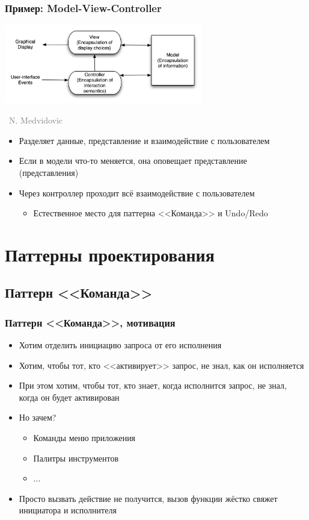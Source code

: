 \documentclass[xetex,mathserif,serif]{beamer}
\newcommand{\attribution}[1] {
    \vspace{-5mm}\begin{flushright}\begin{scriptsize}\textcolor{gray}{\textcopyright\, #1}\end{scriptsize}\end{flushright}
}
\begin{document}
    \begin{frame}
        \frametitle{Пример: Model-View-Controller}
        \begin{center}
            \includegraphics[width=0.65\textwidth]{mvc.png}
            \attribution{N. Medvidovic}
        \end{center}
        \begin{itemize}
            \item Разделяет данные, представление и взаимодействие с пользователем
            \item Если в модели что-то меняется, она оповещает представление (представления)
            \item Через контроллер проходит всё взаимодействие с пользователем
            \begin{itemize}
                \item Естественное место для паттерна <<Команда>> и Undo/Redo
            \end{itemize}
        \end{itemize}
    \end{frame}

    \section{Паттерны проектирования}

    \subsection{Паттерн <<Команда>>}

    \begin{frame}
        \frametitle{Паттерн <<Команда>>, мотивация}
        \begin{itemize}
            \item Хотим отделить инициацию запроса от его исполнения
            \item Хотим, чтобы тот, кто <<активирует>> запрос, не знал, как он исполняется
            \item При этом хотим, чтобы тот, кто знает, когда исполнится запрос, не знал, когда он будет активирован
            \item Но зачем?
            \begin{itemize}
                \item Команды меню приложения
                \item Палитры инструментов
                \item ...
            \end{itemize}
            \item Просто вызвать действие не получится, вызов функции жёстко свяжет инициатора и исполнителя
        \end{itemize}
    \end{frame}
\end{document}
